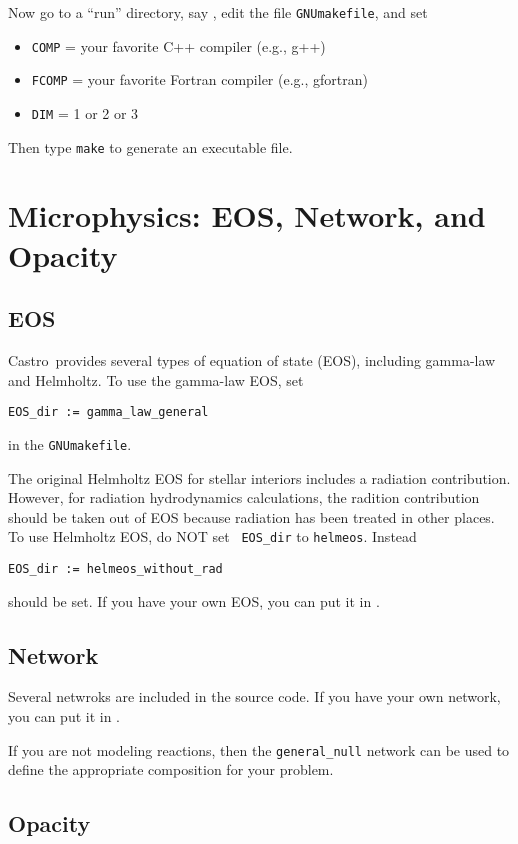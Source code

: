 \documentclass[11pt,letterpaper]{article}
\newcommand{\castro}{{\sf Castro}}
\begin{document}
Now go to a ``run'' directory, say
{\tt{}},
edit the file {\tt GNUmakefile}, and set
\begin{itemize}
\item {\tt COMP} = your favorite C++ compiler (e.g., g++)
\item {\tt FCOMP} = your favorite Fortran compiler (e.g., gfortran)
\item {\tt DIM}   = 1 or 2 or 3
\end{itemize}
Then type {\tt make} to generate an executable file.

\section{Microphysics: EOS, Network, and Opacity}

\subsection{EOS}

\castro\ provides several types of equation of state (EOS), including
gamma-law and Helmholtz.  To use the gamma-law EOS, set
\begin{verbatim}
EOS_dir := gamma_law_general
\end{verbatim}
in the {\tt GNUmakefile}.

The original Helmholtz EOS for stellar interiors includes a radiation
contribution.  However, for radiation hydrodynamics calculations, the
radition contribution should be taken out of EOS because radiation has
been treated in other places.  To use Helmholtz EOS, do NOT set {\tt
  EOS\_dir} to {\tt helmeos}.  Instead
\begin{verbatim}
EOS_dir := helmeos_without_rad
\end{verbatim}
should be set.  If you have your own EOS, you can put it in
{\tt{}}.

\subsection{Network}

Several netwroks are included in the source code.  If you have your
own network, you can put it in
{\tt{}}.

If you are not modeling reactions, then the {\tt general\_null}
network can be used to define the appropriate composition for
your problem.

\subsection{Opacity}
\end{document}
